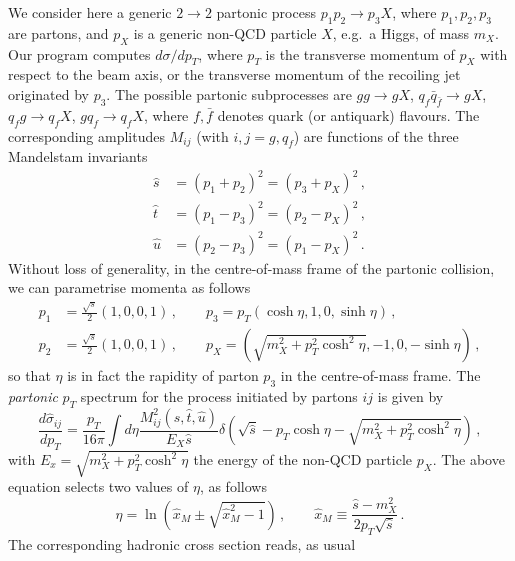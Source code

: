 \documentclass[12pt,a4wide]{article}
\begin{document}
We consider here a generic $2\to 2$ partonic process
$p_1 p_2 \to p_3 X$, where $p_1,p_2,p_3$ are partons, and $p_X$ is a
generic non-QCD particle $X$, e.g.\ a Higgs, of mass $m_X$. Our
program computes $d\sigma/dp_T$, where $p_T$ is the transverse
momentum of $p_X$ with respect to the beam axis, or the transverse
momentum of the recoiling jet originated by $p_3$. The possible
partonic subprocesses are $gg\to g X$, $q_f \bar q_{\bar f} \to g X$,
$q_f g\to q_f X$, $gq_f \to q_fX$, where $f,\bar f$ denotes quark (or
antiquark) flavours. The corresponding amplitudes $M_{ij}$ (with
$i,j=g,q_f$) are functions of the three Mandelstam invariants
\begin{equation}
  \label{eq:Mandelstam}
  \begin{split}
  \hat s & = (p_1+p_2)^2 = (p_3+p_X)^2 \,,\\
  \hat t & = (p_1-p_3)^2 = (p_2-p_X)^2 \,,\\
  \hat u & = (p_2-p_3)^2 = (p_1-p_X)^2 \,.
  \end{split}
\end{equation}
Without loss of generality, in the centre-of-mass frame of the
partonic collision, we can parametrise momenta as follows
\begin{equation}
  \label{eq:momenta}
  \begin{split}
  p_1&=\frac{\sqrt s}{2}(1,0,0,1)\,,\qquad p_3 = p_T(\cosh\eta,1,0,\sinh\eta)\,,\\
  p_2&=\frac{\sqrt s}{2}(1,0,0,1)\,,\qquad p_X = (\sqrt{m_X^2+p^2_T\cosh^2\eta},-1,0,-\sinh\eta)\,,
  \end{split}
\end{equation}
so that $\eta$ is in fact the rapidity of parton $p_3$ in the
centre-of-mass frame. The {\em partonic} $p_T$ spectrum for the
process initiated by partons $ij$ is given by
\begin{equation}
  \label{eq:partonic-pt}
  \frac{d\hat \sigma_{ij}}{dp_T} = \frac{p_T}{16\pi}\int d\eta \frac{M^2_{ij}(\hat s,\hat t,\hat u)}{E_X \hat s} \delta\left(\sqrt{\hat s} - p_T\cosh\eta-\sqrt{m_X^2+p^2_T\cosh^2\eta}\right)\,, 
\end{equation}
with $E_x=\sqrt{m_X^2+p^2_T\cosh^2\eta}$ the energy of the non-QCD
particle $p_X$.  The above equation selects two values of $\eta$, as
follows
\begin{equation}
\label{eq:eta-values}
  \eta = \ln(\hat x_M \pm \sqrt{\hat x_M^2-1})\,,\qquad \hat x_M\equiv\frac{\hat s-m_X^2}{2 p_T \sqrt{\hat s} }\,.
\end{equation}
The corresponding hadronic cross section reads, as usual
\end{document}
